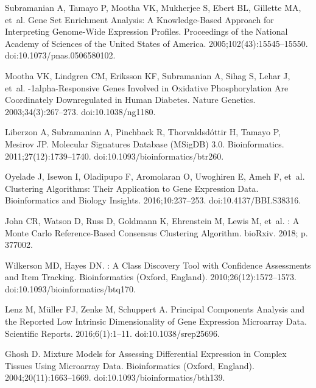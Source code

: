 \documentclass[10pt,letterpaper]{article}
\begin{document}
\begin{thebibliography}{10}
	Subramanian A, Tamayo P, Mootha VK, Mukherjee S, Ebert BL, Gillette MA, et~al.
	\newblock Gene Set Enrichment Analysis: A Knowledge-Based Approach for
	Interpreting Genome-Wide Expression Profiles.
	\newblock Proceedings of the National Academy of Sciences of the United States
	of America. 2005;102(43):15545--15550.
	\newblock doi:{10.1073/pnas.0506580102}.

	Mootha VK, Lindgren CM, Eriksson KF, Subramanian A, Sihag S, Lehar J, et~al.
	-1alpha-Responsive Genes Involved in Oxidative Phosphorylation
	Are Coordinately Downregulated in Human Diabetes.
	\newblock Nature Genetics. 2003;34(3):267--273.
	\newblock doi:{10.1038/ng1180}.

	Liberzon A, Subramanian A, Pinchback R, Thorvaldsd{\'o}ttir H, Tamayo P,
	Mesirov JP.
	\newblock Molecular Signatures Database ({{MSigDB}}) 3.0.
	\newblock Bioinformatics. 2011;27(12):1739--1740.
	\newblock doi:{10.1093/bioinformatics/btr260}.

	Oyelade J, Isewon I, Oladipupo F, Aromolaran O, Uwoghiren E, Ameh F, et~al.
	\newblock Clustering {{Algorithms}}: {{Their Application}} to {{Gene Expression
			Data}}.
	\newblock Bioinformatics and Biology Insights. 2016;10:237--253.
	\newblock doi:{10.4137/BBI.S38316}.

	John CR, Watson D, Russ D, Goldmann K, Ehrenstein M, Lewis M, et~al.
	: {{A Monte Carlo}} Reference-Based Consensus Clustering
	Algorithm.
	\newblock bioRxiv. 2018; p. 377002.

	Wilkerson MD, Hayes DN.
	: A Class Discovery Tool with Confidence
	Assessments and Item Tracking.
	\newblock Bioinformatics (Oxford, England). 2010;26(12):1572--1573.
	\newblock doi:{10.1093/bioinformatics/btq170}.

	Lenz M, M{\"u}ller FJ, Zenke M, Schuppert A.
	\newblock Principal Components Analysis and the Reported Low Intrinsic
	Dimensionality of Gene Expression Microarray Data.
	\newblock Scientific Reports. 2016;6(1):1--11.
	\newblock doi:{10.1038/srep25696}.

	Ghosh D.
	\newblock Mixture Models for Assessing Differential Expression in Complex
	Tissues Using Microarray Data.
	\newblock Bioinformatics (Oxford, England). 2004;20(11):1663--1669.
	\newblock doi:{10.1093/bioinformatics/bth139}.


\end{thebibliography}
\end{document}
